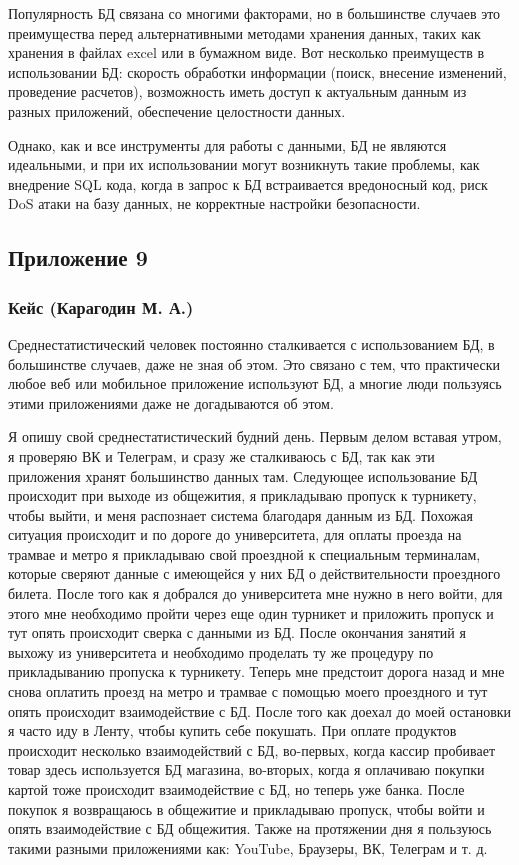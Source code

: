 \documentclass[a4paper,14pt]{extarticle}
\begin{document}
Популярность БД связана со многими факторами, но в большинстве случаев это преимущества перед альтернативными методами хранения данных, таких как хранения в файлах excel или в бумажном виде. Вот несколько преимуществ в использовании БД: скорость обработки информации (поиск, внесение изменений, проведение расчетов), возможность иметь доступ к актуальным данным из разных приложений, обеспечение целостности данных.

Однако, как и все инструменты для работы с данными, БД не являются идеальными, и при их использовании могут возникнуть такие проблемы, как внедрение SQL кода, когда в запрос к БД встраивается вредоносный код, риск DoS атаки на базу данных, не корректные настройки безопасности.

\newpage

\subsection*{\hfill Приложение 9}

\subsubsection*{\centering Кейс (Карагодин М. А.)}

Среднестатистический человек постоянно сталкивается с использованием БД, в большинстве случаев, даже не зная об этом. Это связано с тем, что практически любое веб или мобильное приложение используют БД, а многие люди пользуясь этими приложениями даже не догадываются об этом.

Я опишу свой среднестатистический будний день. Первым делом вставая утром, я проверяю ВК и Телеграм, и сразу же сталкиваюсь с БД, так как эти приложения хранят большинство данных там. Следующее использование БД происходит при выходе из общежития, я прикладываю пропуск к турникету, чтобы выйти, и меня распознает система благодаря данным из БД. Похожая ситуация происходит и по дороге до университета, для оплаты проезда на трамвае и метро я прикладываю свой проездной к специальным терминалам, которые сверяют данные с имеющейся у них БД о действительности проездного билета. После того как я добрался до университета мне нужно в него войти, для этого мне необходимо пройти через еще один турникет и приложить пропуск и тут опять происходит сверка с данными из БД. После окончания занятий я выхожу из университета и необходимо проделать ту же процедуру по прикладыванию пропуска к турникету. Теперь мне предстоит дорога назад и мне снова оплатить проезд на метро и трамвае с помощью моего проездного и тут опять происходит взаимодействие с БД. После того как доехал до моей остановки я часто иду в Ленту, чтобы купить себе покушать. При оплате продуктов происходит несколько взаимодействий с БД, во-первых, когда кассир пробивает товар здесь используется БД магазина, во-вторых, когда я оплачиваю покупки картой тоже происходит взаимодействие с БД, но теперь уже банка. После покупок я возвращаюсь в общежитие и прикладываю пропуск, чтобы войти и опять взаимодействие с БД общежития. Также на протяжении дня я пользуюсь такими разными приложениями как: YouTube, Браузеры, ВК, Телеграм и т. д.
\end{document}
